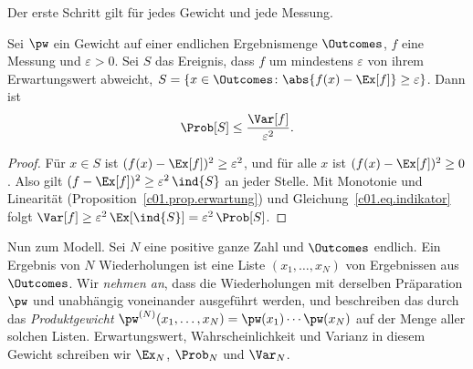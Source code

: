 \begin{vertiefung}[id=c01.v2,
    titel={Wie nah liegen relative Häufigkeiten an den Wahrscheinlichkeiten?},
    wozu={Der Kern beschränkt die statistische Lesart auf unabhängige Wiederholungen
      derselben Präparation. Hier wird eine obere Schranke für die Wahrscheinlichkeit
      einer Abweichung der relativen Häufigkeit um mindestens $\varepsilon > 0$ bewiesen;
      diese Schranke nimmt mit der positiven ganzen Anzahl der Wiederholungen ab.},
    voraussetzung={Abschnitte~\ref{c01.s2} und~\ref{c01.s3} bis
      Gleichung~\eqref{c01.eq.var-indikator}. Der Rest des Kurses benutzt nur das Ergebnis
      in Worten.},
    zurueck={Die Wahrscheinlichkeit, dass die relative Häufigkeit eines Ereignisses nach
      $N$ unabhängigen Wiederholungen um mindestens $\varepsilon$ von seiner
      Wahrscheinlichkeit abweicht, ist höchstens $1/(4N\varepsilon^2)$.}]
  Der erste Schritt gilt für jedes Gewicht und jede Messung.

  \begin{lemma}\label{c01.lem.tschebyscheff}
    Sei $\pw$ ein Gewicht auf einer endlichen Ergebnismenge $\Outcomes$, $f$ eine Messung
    und $\varepsilon > 0$. Sei $S$ das Ereignis, dass $f$ um mindestens $\varepsilon$ von
    ihrem Erwartungswert abweicht,
    $S = \{x \in \Outcomes \colon \abs{f(x) - \Ex[f]} \geq \varepsilon\}$. Dann ist
    \begin{equation}\label{c01.eq.tschebyscheff}
      \Prob[S] \leq \frac{\Var[f]}{\varepsilon^2} .
    \end{equation}
  \end{lemma}
  \begin{proof}
    Für $x \in S$ ist $(f(x) - \Ex[f])^2 \geq \varepsilon^2$, und für alle $x$ ist
    $(f(x) - \Ex[f])^2 \geq 0$. Also gilt $(f - \Ex[f])^2 \geq \varepsilon^2\, \ind{S}$ an
    jeder Stelle. Mit Monotonie und Linearität (Proposition~\ref{c01.prop.erwartung}) und
    Gleichung~\eqref{c01.eq.indikator} folgt
    $\Var[f] \geq \varepsilon^2\, \Ex[\ind{S}] = \varepsilon^2\, \Prob[S]$.
  \end{proof}

  Nun zum Modell. Sei $N$ eine positive ganze Zahl und $\Outcomes$ endlich. Ein Ergebnis
  von $N$ Wiederholungen ist eine Liste $(x_1, \dots, x_N)$
  von Ergebnissen aus $\Outcomes$. Wir \emph{nehmen an}, dass die Wiederholungen mit
  derselben Präparation $\pw$ und unabhängig voneinander ausgeführt werden, und
  beschreiben das durch das \emph{Produktgewicht}
  $\pw^{(N)}(x_1, \dots, x_N) = \pw(x_1)\cdots\pw(x_N)$ auf der Menge aller solchen Listen.
  Erwartungswert, Wahrscheinlichkeit und Varianz in diesem Gewicht schreiben wir $\Ex_N$,
  $\Prob_N$ und $\Var_N$.


\end{vertiefung}
